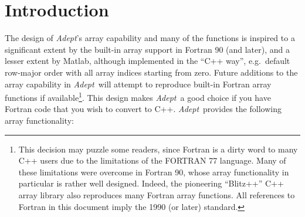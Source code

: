 \documentclass[a4,oneside]{book}
\def\Adept{\emph{Adept}}
\begin{document}
\section{Introduction}
\label{sec:array_functionality}
The design of \Adept's array capability and many of the functions is
inspired to a significant extent by the built-in array support in
Fortran 90 (and later), and a lesser extent by Matlab, although
implemented in the ``C++ way'', e.g.\ default row-major order with all
array indices starting from zero.  Future additions to the array
capability in \Adept\ will attempt to reproduce built-in Fortran array
functions if available\footnote{This decision may puzzle some readers,
  since Fortran is a dirty word to many C++ users due to the
  limitations of the FORTRAN 77 language. Many of these limitations
  were overcome in Fortran 90, whose array functionality in particular
  is rather well designed. Indeed, the pioneering ``Blitz++'' C++
  array library \cite[]{Veldhuizen1995} also reproduces many Fortran
  array functions. All references to Fortran in this document imply
  the 1990 (or later) standard.}. This design makes \Adept\ a good
choice if you have Fortran code that you wish to convert to C++.
\Adept\ provides the following array functionality:
%
\end{document}
